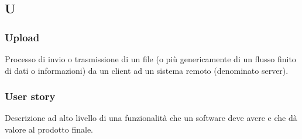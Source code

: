 \subsection*{\textbf{\hfill \Huge{U} \hfill}} 
\subsubsection*{Upload}
Processo di invio o trasmissione di un file (o più genericamente di un flusso finito di dati o informazioni) da un client ad un sistema remoto (denominato server).
\subsubsection*{User story}
Descrizione ad alto livello di una funzionalità che un software deve avere e che dà valore al prodotto finale.
